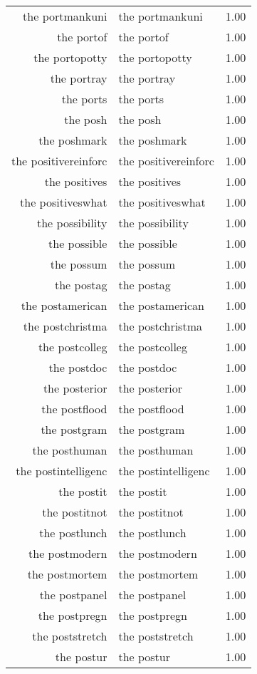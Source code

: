 \begin{table}[ht]
\begin{tabular}{rlr}
  the portmankuni & the portmankuni & 1.00 \\ 
  the portof & the portof & 1.00 \\ 
  the portopotty & the portopotty & 1.00 \\ 
  the portray & the portray & 1.00 \\ 
  the ports & the ports & 1.00 \\ 
  the posh & the posh & 1.00 \\ 
  the poshmark & the poshmark & 1.00 \\ 
  the positivereinforc & the positivereinforc & 1.00 \\ 
  the positives & the positives & 1.00 \\ 
  the positiveswhat & the positiveswhat & 1.00 \\ 
  the possibility & the possibility & 1.00 \\ 
  the possible & the possible & 1.00 \\ 
  the possum & the possum & 1.00 \\ 
  the postag & the postag & 1.00 \\ 
  the postamerican & the postamerican & 1.00 \\ 
  the postchristma & the postchristma & 1.00 \\ 
  the postcolleg & the postcolleg & 1.00 \\ 
  the postdoc & the postdoc & 1.00 \\ 
  the posterior & the posterior & 1.00 \\ 
  the postflood & the postflood & 1.00 \\ 
  the postgram & the postgram & 1.00 \\ 
  the posthuman & the posthuman & 1.00 \\ 
  the postintelligenc & the postintelligenc & 1.00 \\ 
  the postit & the postit & 1.00 \\ 
  the postitnot & the postitnot & 1.00 \\ 
  the postlunch & the postlunch & 1.00 \\ 
  the postmodern & the postmodern & 1.00 \\ 
  the postmortem & the postmortem & 1.00 \\ 
  the postpanel & the postpanel & 1.00 \\ 
  the postpregn & the postpregn & 1.00 \\ 
  the poststretch & the poststretch & 1.00 \\ 
  the postur & the postur & 1.00 \\ 

\end{tabular}
\end{table}
